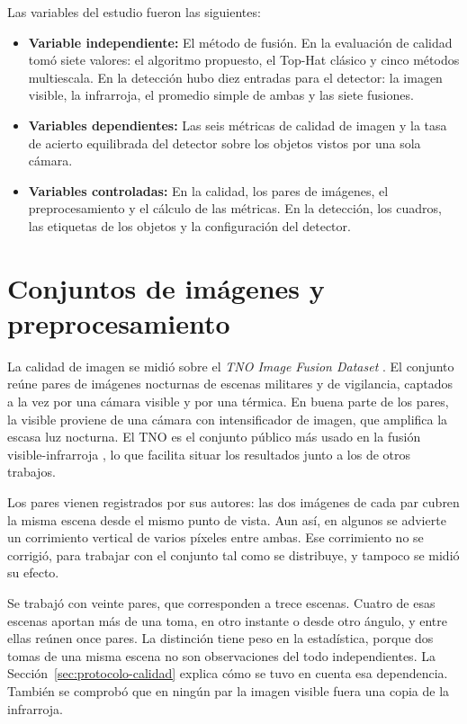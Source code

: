 Las variables del estudio fueron las siguientes:
\begin{itemize}
\item \textbf{Variable independiente:} El método de fusión. En la evaluación de calidad tomó siete
valores: el algoritmo propuesto, el Top-Hat clásico y cinco métodos multiescala. En la detección hubo
diez entradas para el detector: la imagen visible, la infrarroja, el promedio simple de ambas y las
siete fusiones.
\item \textbf{Variables dependientes:} Las seis métricas de calidad de imagen y la tasa de acierto
equilibrada del detector sobre los objetos vistos por una sola cámara.
\item \textbf{Variables controladas:} En la calidad, los pares de imágenes, el preprocesamiento y el
cálculo de las métricas. En la detección, los cuadros, las etiquetas de los objetos y la configuración
del detector.
\end{itemize}

\section{Conjuntos de imágenes y preprocesamiento}
\label{sec:corpus}

La calidad de imagen se midió sobre el \textit{TNO Image Fusion Dataset} \parencite{toet2014, toet2017}. El
conjunto reúne pares de imágenes nocturnas de escenas militares y de vigilancia, captados a la vez por una cámara
visible y por una térmica. En buena parte de los pares, la visible proviene de una cámara con
intensificador de imagen, que amplifica la escasa luz nocturna. El TNO es el conjunto público más usado
en la fusión visible-infrarroja \parencite{liu2022}, lo que facilita situar los resultados junto a los de
otros trabajos.

Los pares vienen registrados por sus autores: las dos imágenes de cada par cubren la misma escena desde
el mismo punto de vista. Aun así, en algunos se advierte un corrimiento vertical de varios píxeles entre
ambas. Ese corrimiento no se corrigió, para trabajar con el conjunto tal como se distribuye, y tampoco
se midió su efecto.

Se trabajó con veinte pares, que corresponden a trece escenas. Cuatro de esas escenas aportan más de una
toma, en otro instante o desde otro ángulo, y entre ellas reúnen once pares. La distinción tiene peso en
la estadística, porque dos tomas de una misma escena no son observaciones del todo independientes. La
Sección~\ref{sec:protocolo-calidad} explica cómo se tuvo en cuenta esa dependencia. También se comprobó
que en ningún par la imagen visible fuera una copia de la infrarroja.

